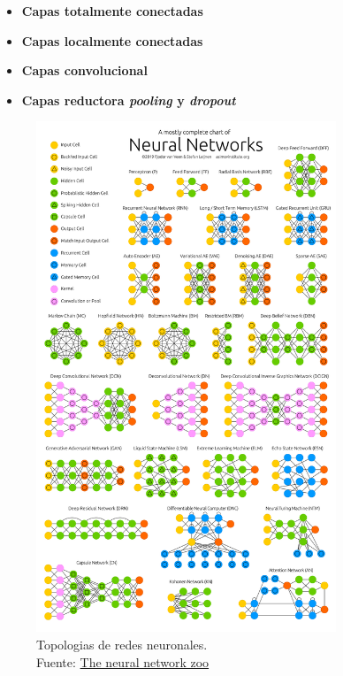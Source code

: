 \begin{itemize}
    \item \textbf{Capas totalmente conectadas}
    \item \textbf{Capas localmente conectadas}
    \item \textbf{Capas convolucional}
    \item \textbf{Capas reductora \textit{pooling} y \textit{dropout}}
\end{itemize}


\begin{figure}[H]
    \centering
    \includegraphics[width=0.8\textwidth]{figures/NeuralNetworkZo19High.png}
    \caption{Topologias de redes neuronales.\\Fuente: \href{https://www.asimovinstitute.org/neural-network-zoo/}{The neural network zoo}}
    \label{fig:NeuralNetworkZo19High}
\end{figure}

